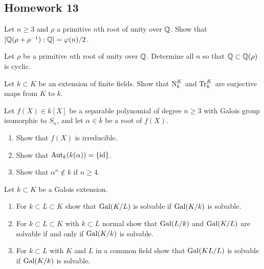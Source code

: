 \subsection{Homework 13}
\begin{problem}
Let $n\geq 3$ and $\rho$ a primitive $n$th root of unity over $\mathbb{Q}$. Show
that $[\mathbb{Q}(\rho+\rho^{-1}):\mathbb{Q}]=\varphi(n)/2$.
\end{problem}
\begin{solution}
\end{solution}

\begin{problem}
Let $\rho$ be a primitive $n$th root of unity over $\mathbb{Q}$. Determine all
$n$ so that $\mathbb{Q}\subset\mathbb{Q}(\rho)$ is cyclic.
\end{problem}
\begin{solution}
\end{solution}

\begin{problem}
  Let $k\subset K$ be an extension of finite fields. Show that
  $\operatorname{N}_k^K$ and $\operatorname{Tr}_k^K$ are surjective maps from $K$ to
  $k$.
\end{problem}
\begin{solution}
\end{solution}

\begin{problem}
  Let $f(X)\in k[X]$ be a separable polynomial of degree $n\geq 3$ with
  Galois group isomorphic to $S_n$, and let $\alpha\in\bar k$ be a root
  of $f(X)$.
  \begin{enumerate}[label=(\alph*),noitemsep]
  \item Show that $f(X)$ is irreducible.
  \item Show that $\operatorname{Aut}_k(k(\alpha))=\{\operatorname{id}\}$.
  \item Show that $\alpha^n\notin k$ if $n\geq 4$.
  \end{enumerate}
\end{problem}
\begin{solution}
\end{solution}

\begin{problem}
  Let $k\subset K$ be a Galois extension.
\begin{enumerate}[label=(\alph*),noitemsep]
\item For $k\subset L\subset K$ show that $\operatorname{Gal}(K/L)$ is
  solvable if $\operatorname{Gal}(K/k)$ is solvable.
\item For $k\subset L\subset K$ with $k\subset L$ normal show
  that $\operatorname{Gal}(L/k)$ and $\operatorname{Gal}(K/L)$ are solvable if and only if
  $\operatorname{Gal}(K/k)$ is solvable.
\item For $k\subset L$ with $K$ and $L$ in a common field show
  that $\operatorname{Gal}(KL/L)$ is solvable if $\operatorname{Gal}(K/k)$ is solvable.
\end{enumerate}
\end{problem}
\begin{solution}
\end{solution}

